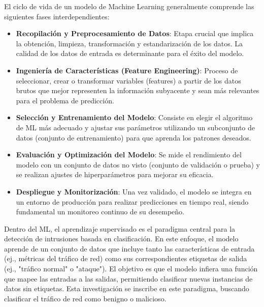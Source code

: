 El ciclo de vida de un modelo de Machine Learning generalmente comprende las siguientes fases interdependientes:

\begin{itemize}
    
    \item\textbf{Recopilación y Preprocesamiento de Datos}: Etapa crucial que implica la obtención, limpieza, transformación y estandarización de los datos. La calidad de los datos de entrada es determinante para el éxito del modelo.
    
    \item\textbf{Ingeniería de Características (Feature Engineering)}: Proceso de seleccionar, crear o transformar variables (features) a partir de los datos brutos que mejor representen la información subyacente y sean más relevantes para el problema de predicción.
    
    \item\textbf{Selección y Entrenamiento del Modelo}: Consiste en elegir el algoritmo de ML más adecuado y ajustar sus parámetros utilizando un subconjunto de datos (conjunto de entrenamiento) para que aprenda los patrones deseados.
    
    \item\textbf{Evaluación y Optimización del Modelo}: Se mide el rendimiento del modelo con un conjunto de datos no visto (conjunto de validación o prueba) y se realizan ajustes de hiperparámetros para mejorar su eficacia.
    
    \item\textbf{Despliegue y Monitorización}: Una vez validado, el modelo se integra en un entorno de producción para realizar predicciones en tiempo real, siendo fundamental un monitoreo continuo de su desempeño.

\end{itemize}

Dentro del ML, el aprendizaje supervisado es el paradigma central para la detección de intrusiones basada en clasificación. En este enfoque, el modelo aprende de un conjunto de datos que incluye tanto las características de entrada (ej., métricas del tráfico de red) como sus correspondientes etiquetas de salida (ej., "tráfico normal" o "ataque"). El objetivo es que el modelo infiera una función que mapee las entradas a las salidas, permitiendo clasificar nuevas instancias de datos sin etiquetas. Esta investigación se inscribe en este paradigma, buscando clasificar el tráfico de red como benigno o malicioso.

